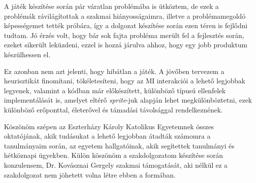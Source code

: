 \documentclass[
]{thesis-ekf}
\theoremstyle{definition}
\theoremstyle{remark}
\begin{document}
A játék készítése során pár váratlan problémába is ütköztem, de ezek a problémák rávilágítottak a szakmai hiányosságaimra, illetve a problémamegoldó képességemet tették próbára, így a dolgozat készítése során ezen téren is fejlődni tudtam. Jó érzés volt, hogy bár sok fajta probléma merült fel a fejlesztés során, ezeket sikerült leküzdeni, ezzel is hozzá járulva ahhoz, hogy egy jobb produktum készülhessen el.

Ez azonban nem azt jelenti, hogy hibátlan a játék. A jövőben tervezem a heurisztikát finomítani, tökéletesíteni, hogy az MI interakciói a lehető legjobbak legyenek, valamint a kódban már előkészített, különböző típusú ellenfelek implementálását is, amelyet eltérő \emph{sprite}-juk alapján lehet megkülönböztetni, ezek különböző erőponttal, életerővel és támadási távolsággal rendelkeznének.

Köszönöm szépen az Eszterházy Károly Katolikus Egyetemnek összes oktatójának, akik tudásukat a lehető legjobban átadták számomra a tanulmányaim során, az egyetem hallgatóinak, akik segítettek tanulmányi és hétköznapi ügyekben. Külön köszönöm a szakdolgozatom készítése során konzulensem, Dr. Kovásznai Gergely szakmai támogatását, aki nélkül ez a szakdolgozat nem jöhetett volna létre ebben a formában.
\end{document}
